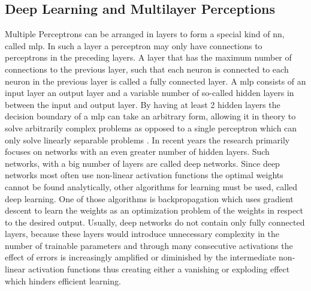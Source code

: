 \subsection{Deep Learning and Multilayer Perceptions}
Multiple Perceptrons can be arranged in layers to form a special kind of \ac{nn}, called \ac{mlp}. In such a layer a perceptron may only have connections to perceptrons in the preceding layers. A layer that has the maximum number of connections to the previous layer, such that each neuron is connected to each neuron in the previous layer is called a fully connected layer. A \ac{mlp} consists of an input layer an output layer and a variable number of so-called hidden layers in between the input and output layer. By having at least 2 hidden layers the decision boundary of a \ac{mlp} can take an arbitrary form, allowing it in theory to solve arbitrarily complex problems as opposed to a single perceptron which can only solve linearly separable problems \cite{Lapedes1988}. In recent years the research primarily focuses on networks with an even greater number of hidden layers. Such networks, with a big number of layers are called deep networks. Since deep networks most often use non-linear activation functions the optimal weights cannot be found analytically, other algorithms for learning must be used, called deep learning. One of those algorithms is backpropagation which uses gradient descent to learn the weights as an optimization problem of the weights in respect to the desired output. Usually, deep networks do not contain only fully connected layers, because these layers would introduce unnecessary complexity in the number of trainable parameters and through many consecutive activations the effect of errors is increasingly amplified or diminished by the intermediate non-linear activation functions thus creating either a vanishing or exploding effect which hinders efficient learning\cite{Hanin2018}.

